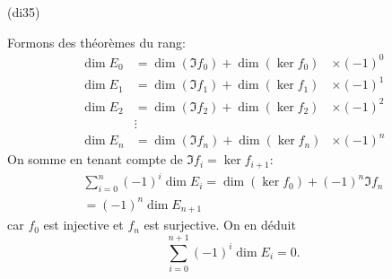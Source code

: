 \begin{tiny}(di35)\end{tiny} Formons des théorèmes du rang: 
\begin{align*}
\dim E_0 &= \dim (\Im f_0) + \dim (\ker f_0) &\times (-1)^0 \\  
\dim E_1 &= \dim (\Im f_1) + \dim (\ker f_1) &\times (-1)^1 \\
\dim E_2 &= \dim (\Im f_2) + \dim (\ker f_2) &\times (-1)^2  \\
 & \vdots \\
 \dim E_n &= \dim (\Im f_n) + \dim (\ker f_n) &\times (-1)^n
\end{align*}
On somme en tenant compte de $\Im f_i = \ker f_{i+1}$:
\begin{multline*}
  \sum_{i=0}^n (-1)^{i}\dim E_i = \dim (\ker f_0) + (-1)^n\Im f_{n}\\
  = (-1)^n \dim E_{n+1}
\end{multline*}
car $f_0$ est injective et $f_n$ est surjective. On en déduit
\[
  \sum_{i=0}^{n+1} (-1)^{i}\dim E_i = 0.
\]
